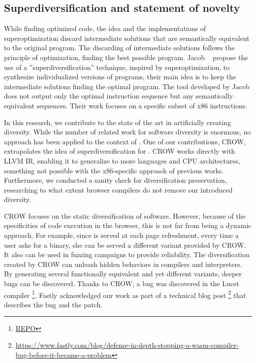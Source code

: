 \subsection*{Superdiversification and statement of novelty}

While finding optimized code, the idea and the implementations of superoptimization discard intermediate solutions that are semantically equivalent to the original program. The discarding of intermediate solutions follows the principle of optimization, finding the best possible program. Jacob \etal~\cite{jacob2008superdiversifier} propose the use of a ''superdiversification'' technique, inspired by superoptimization,
to synthesize individualized versions of programs, their main idea is to keep the intermediate solutions finding the optimal program.
The tool developed by Jacob \etal does not output only the optimal instruction sequence but any semantically equivalent sequences.
Their work focuses on a specific subset of x86 instructions.

In this research, we contribute to the state of the art in artificially creating diversity. While the number of related work for software diversity is enormous, no approach has been applied to the context of \wasm. One of our contributions, CROW, extrapolates the idea of superdiversification for \wasm. CROW works directly with LLVM IR, enabling it to generalize to more languages and CPU architectures, something not possible with the x86-specific approach of previous works.
Furthermore, we conducted a sanity check for diversification preservation, researching to what extent browser compilers do not remove our introduced diversity.

CROW focuses on the static diversification of software. However, because of the specificities of code execution in the browser, this is not far from being a dynamic approach. For example, since \wasm is served at each page refreshment, every time a user asks for a \wasm binary, she can be served a different variant provided by CROW.
It also can be used in fuzzing campaigns \citationneeded to provide reliability. The diversification created by CROW can unleash hidden behaviors in compilers and interpreters.
By generating several functionally equivalent and yet different variants, deeper bugs can be discovered. 
Thanks to CROW, a bug was discovered in the Lucet compiler \footnote{\url{REPO}}.
Fastly acknowledged our work as part of a technical blog post 
\footnote{\url{https://www.fastly.com/blog/defense-in-depth-stopping-a-wasm-compiler-bug-before-it-became-a-problem}} that describes the bug and the patch. 


